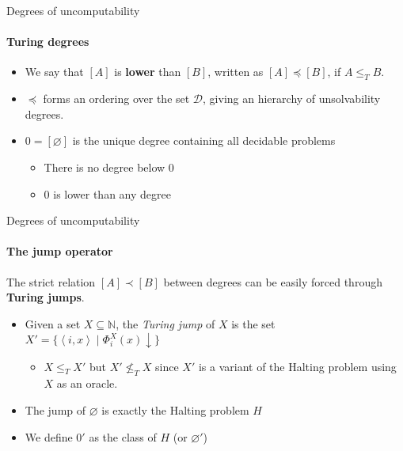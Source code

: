 \documentclass{beamer}
\newcommand{\N}{\mathbb{N}}
\newcommand{\abk}[1]{\left\langle#1\right\rangle}
\begin{document}
\begin{frame}{Degrees of uncomputability}
\framesubtitle{Turing degrees}

    \begin{itemize}[<+->]
        \setlength{\itemindent}{-2em}

        \item[] We say that $[A]$ is \textbf{lower} than $[B]$, written as $[A] \preceq [B]$, if $A \leq_T B$.
        
        \quad
        
        \item[] $\preceq$ forms an ordering over the set $\mathcal{D}$, giving an hierarchy of unsolvability degrees.
        
        \quad
        
        \item[] $0 = [\varnothing]$ is the unique degree containing all decidable problems
        \begin{itemize}
            \item There is no degree below $0$
            \item $0$ is lower than any degree
        \end{itemize}
    \end{itemize}
\end{frame}

\begin{frame}{Degrees of uncomputability}
\framesubtitle{The jump operator}
    The strict relation $[A] \prec [B]$ between degrees can be easily forced through \textbf{Turing jumps}.
    \begin{itemize}[<+->]
        \item Given a set $X \subseteq \N$, the \textit{Turing jump} of $X$ is the set $X' = \{\abk{i,x} \mid \Phi_i^X(x) \downarrow\}$
        \begin{itemize}
            \item $X \leq_T X'$ but $X' \not\leq_T X$ since $X'$ is a variant of the Halting problem using $X$ as an oracle.
        \end{itemize}

        \quad

        \item The jump of $\varnothing$ is exactly the Halting problem $H$
        \item We define $0'$ as the class of $H$ (or $\varnothing'$)
    \end{itemize}
\end{frame}
\end{document}
